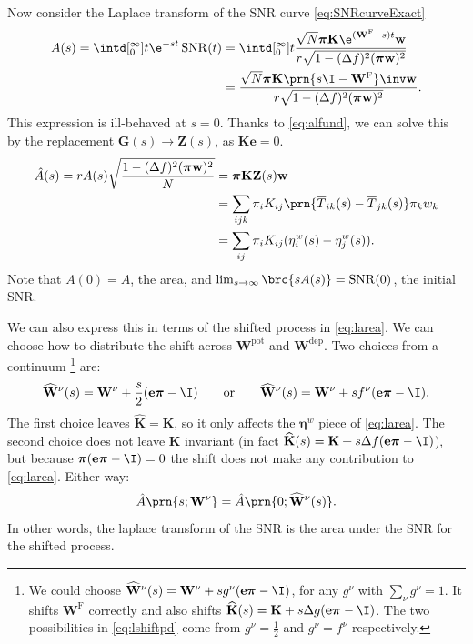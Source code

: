 \documentclass[12pt]{article}
\newcommand{\onev}{\mathbf{e}}
\newcommand{\eqm}{\pi}
\newcommand{\eq}{\boldsymbol{\eqm}}
\newcommand{\fptm}{T}
\newcommand{\fptbm}{\overline{\fptm}}
\newcommand{\fundm}{Z}
\newcommand{\fund}{\mathbf{\fundm}}
\newcommand{\etwm}{\eta^w}
\newcommand{\etw}{\boldsymbol{\eta}^w}
\newcommand{\wm}{w}
\newcommand{\w}{\mathbf{\wm}}
\newcommand{\Wm}{W}
\newcommand{\W}{\mathbf{\Wm}}
\newcommand{\encm}{K}
\newcommand{\enc}{\mathbf{\encm}}
\newcommand{\frg}{\W^{\mathrm{F}}}
\newcommand{\pot}{^{\text{pot}}}
\newcommand{\dep}{^{\text{dep}}}
\DeclareMathOperator{\SNR}{SNR}
\newcommand{\shift}[1]{\widehat{#1}}
\begin{document}
Now consider the Laplace transform of the SNR curve \eqref{eq:SNRcurveExact}
%
\begin{equation}\label{eq:lsnr}
\begin{aligned}
  A(s) = \intd[_0^{\infty}]{t} \e^{-st}\SNR(t) 
   &= \intd[_0^{\infty}]{t} \frac{ \sqrt{N} \eq \enc \e^{(\frg-s)t} \w }
                                { r\sqrt{1-(\Delta f)^2(\eq\w)^2} } \\
   &= \frac{\sqrt{N} \eq \enc \prn{s \I - \frg}\inv \w }{r\sqrt{1-(\Delta f)^2(\eq\w)^2}}.
\end{aligned}
\end{equation}
%
This expression is ill-behaved at \(s=0\).
Thanks to \eqref{eq:alfund}, we can solve this by the replacement \(\mathbf{G}(s) \to \fund(s)\), as \(\enc\onev=0\).
%
\begin{equation}\label{eq:larea}
\begin{aligned}
  \hat{A}(s) = r A(s) \sqrt{\frac{{{1-(\Delta f)^2(\eq\w)^2}}}{N}}  &=  \eq \enc \fund(s) \w \\
    &= \sum_{ijk} \eqm_i \encm_{ij} \prn{\fptbm_{ik}(s)-\fptbm_{jk}(s)} \eqm_k \wm_k \\
    &= \sum_{ij}  \eqm_i \encm_{ij} (\etwm_{i}(s) - \etwm_{j}(s)).
\end{aligned}
\end{equation}
%
Note that \(A(0)=A\), the area, and \(\lim_{s\to\infty} \brc{sA(s)} = \SNR(0)\), the initial SNR.

We can also express this in terms of the shifted process in \cref{eq:larea}.
We can choose how to distribute the shift across \(\W \pot\) and \(\W \dep\).
Two choices from a continuum%
\footnote{We could choose \( \shift{\W}^\nu(s) = \W^\nu + s g^\nu (\onev \eq - \I) \), for any \(g^\nu \) with \( \sum_\nu g^\nu = 1 \).
It shifts \(\frg\) correctly and also shifts \( \shift{\enc}(s) = \enc + s \Delta g (\onev \eq - \I) \).
The two possibilities in \cref{eq:lshiftpd} come from \(g^\nu = \frac{1}{2}\) and \(g^\nu = f^\nu\) respectively.}
are:
%
\begin{equation}\label{eq:lshiftpd}
  \shift{\W}^\nu(s) = \W^\nu + \frac{s}{2} (\onev \eq - \I)
  \qquad \text{or} \qquad
  \shift{\W}^\nu(s) = \W^\nu + s f^\nu (\onev \eq - \I).
\end{equation}
%
The first choice leaves \( \shift{\enc} = \enc \), so it only affects the \(\etw\) piece of \cref{eq:larea}.
The second choice does not leave \(\enc\) invariant (in fact \( \shift{\enc}(s) = \enc + s \Delta f (\onev \eq - \I) \)), but because \( \eq (\onev \eq - \I) = 0 \) the shift does not make any contribution to \cref{eq:larea}.
Either way:
%
\begin{equation}\label{eq:lareashift}
  \hat{A}\prn{s; \W^\nu} = \hat{A}\prn{0; \shift{\W}^\nu(s)}.
\end{equation}
%
In other words, the laplace transform of the SNR is the area under the SNR for the shifted process.
\end{document}
